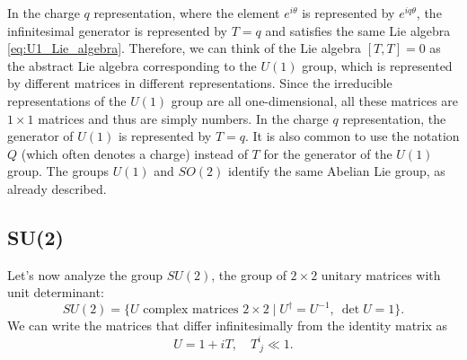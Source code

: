 In the charge $q$ representation, where the element $e^{i\theta}$ is represented by $e^{iq\theta}$, the infinitesimal generator is represented by $T = q$ and satisfies the same Lie algebra \eqref{eq:U1_Lie_algebra}. Therefore, we can think of the Lie algebra $[T, T] = 0$ as the abstract Lie algebra corresponding to the $U(1)$ group, which is represented by different matrices in different representations. Since the irreducible representations of the $U(1)$ group are all one-dimensional, all these matrices are $1 \times 1$ matrices and thus are simply numbers. In the charge $q$ representation, the generator of $U(1)$ is represented by $T = q$. It is also common to use the notation $Q$ (which often denotes a charge) instead of $T$ for the generator of the $U(1)$ group. The groups $U(1)$ and $SO(2)$ identify the same Abelian Lie group, as already described.

\subsection{SU(2)}

Let's now analyze the group $SU(2)$, the group of $2 \times 2$ unitary matrices with unit determinant:
\[
    SU(2) = \{ U \text{ complex matrices } 2 \times 2 \mid U^\dagger = U^{-1}, \ \det U = 1 \}.
\]
We can write the matrices that differ infinitesimally from the identity matrix as
\[
    U = 1 + i T, \quad T^i_{\ j} \ll 1.
\]

